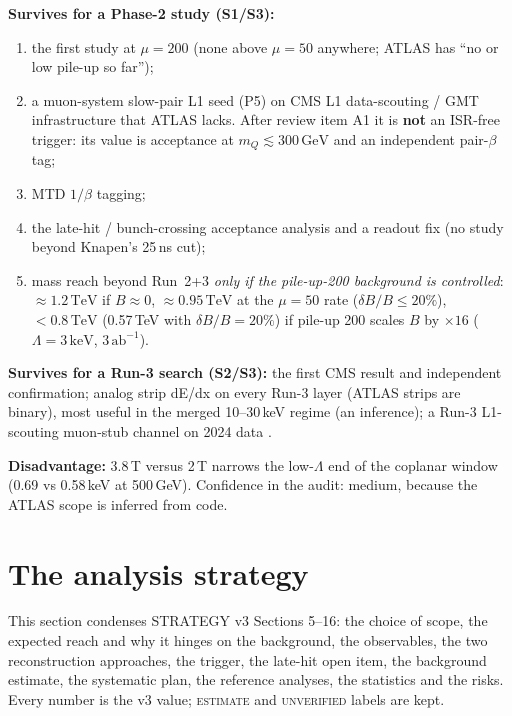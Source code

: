 \documentclass[11pt,a4paper]{article}
\newcommand{\EST}{\textsc{estimate}}
\newcommand{\UNV}{\textsc{unverified}}
\newcommand{\mQ}{m_Q}
\newcommand{\GeV}{\,\mathrm{GeV}}
\newcommand{\TeV}{\,\mathrm{TeV}}
\newcommand{\keV}{\,\mathrm{keV}}
\newcommand{\abinv}{\,\mathrm{ab}^{-1}}
\begin{document}
\textbf{Survives for a Phase-2 study (S1/S3):}
\begin{enumerate}[itemsep=1pt]
\item the first study at $\mu=200$ (none above $\mu=50$ anywhere; ATLAS has ``no or low pile-up so far'');
\item a muon-system slow-pair L1 seed (P5) on CMS L1 data-scouting / GMT infrastructure that ATLAS lacks. After review item A1 it is \textbf{not} an ISR-free trigger: its value is acceptance at $\mQ\lesssim300\GeV$ and an independent pair-$\beta$ tag;
\item MTD $1/\beta$ tagging;
\item the late-hit / bunch-crossing acceptance analysis and a readout fix (no study beyond Knapen's 25\,ns cut);
\item mass reach beyond Run~2+3 \emph{only if the pile-up-200 background is controlled}: $\approx1.2\TeV$ if $B\approx0$, $\approx0.95\TeV$ at the $\mu=50$ rate ($\delta B/B\leq20\%$), $<0.8\TeV$ (0.57\,TeV with $\delta B/B=20\%$) if pile-up 200 scales $B$ by $\times16$ ($\Lambda=3\keV$, $3\abinv$).
\end{enumerate}
\textbf{Survives for a Run-3 search (S2/S3):} the first CMS result and independent confirmation; analog strip dE/dx on every Run-3 layer (ATLAS strips are binary), most useful in the merged 10--30\,keV regime (an inference); a Run-3 L1-scouting muon-stub channel on 2024 data \cite{L1DS}.

\textbf{Disadvantage:} 3.8\,T versus 2\,T narrows the low-$\Lambda$ end of the coplanar window (0.69 vs 0.58\,keV at 500\,GeV). Confidence in the audit: medium, because the ATLAS scope is inferred from code.

\section{The analysis strategy}\label{sec:strategy}
This section condenses STRATEGY v3 Sections 5--16: the choice of scope, the expected reach and why it hinges on the background, the observables, the two reconstruction approaches, the trigger, the late-hit open item, the background estimate, the systematic plan, the reference analyses, the statistics and the risks. Every number is the v3 value; \EST{} and \UNV{} labels are kept.
\end{document}
